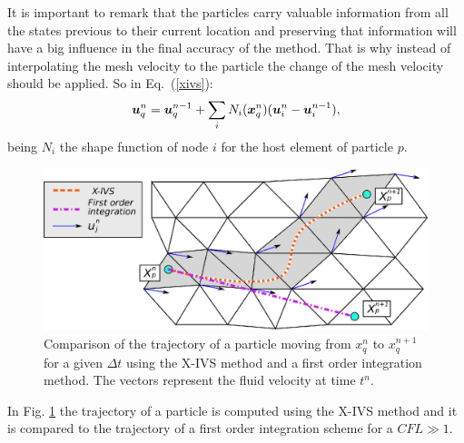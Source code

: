 It is important to remark that the particles carry valuable information from all the states previous to their current location and preserving that information will have a big influence in the final accuracy of the method. That is why instead of interpolating the mesh velocity to the particle the change of the mesh velocity should be applied. So in Eq.~(\ref{xivs}):
%
\begin{equation}\label{eq:partcor}
  \boldsymbol{u}_q^{n}=\boldsymbol{u}_q^{n-1}+\sum_{i}N_i(\boldsymbol{x}_q^n)(\boldsymbol{u}_i^n-\boldsymbol{u}_i^{n-1}),
\end{equation}
%
being $N_i$ the shape function of node $i$ for the host element of particle $p$.
\begin{figure}[htp] 
\centering 
\includegraphics[scale=.6]{./imgs/xivs.eps}
\caption{Comparison of the trajectory of a particle moving from $x_q^n$ to $x_q^{n+1}$ for a given $\Delta t$ using the X-IVS method and a first order integration method. The vectors represent the fluid velocity at time $t^n$.}
\label{fig:xivs}
\end{figure}
%
In Fig. \ref{fig:xivs} the trajectory of a particle is computed using the X-IVS method and it is compared to the trajectory of a first order integration scheme for a $CFL \gg 1$. 

